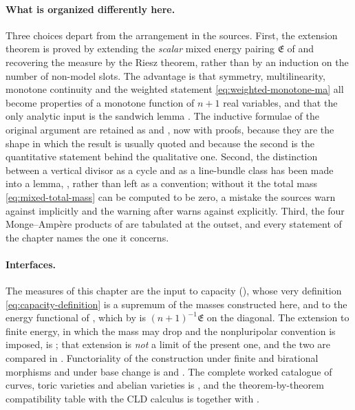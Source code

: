 \paragraph{What is organized differently here.}
Three choices depart from the arrangement in the sources.  First, the
extension theorem is proved by extending the \emph{scalar} mixed energy
pairing \(\mathfrak E\) of  and recovering the
measure by the Riesz theorem, rather than by an induction on the number of
non-model slots.  The advantage is that symmetry, multilinearity, monotone
continuity and the weighted statement \eqref{eq:weighted-monotone-ma} all
become properties of a monotone function of \(n+1\) real variables, and that
the only analytic input is the sandwich lemma
.  The inductive formulae of the original argument
are retained as  and
, now with proofs, because they are
the shape in which the result is usually quoted and because the second is the
quantitative statement behind the qualitative one.  Second, the distinction
between a vertical divisor as a cycle and as a line-bundle class has been
made into a lemma, , rather than left as a
convention; without it the total mass \eqref{eq:mixed-total-mass} can be
computed to be zero, a mistake the sources warn against implicitly and the
warning after  warns against explicitly.
Third, the four Monge--Amp\`ere products of  are
tabulated at the outset, and every statement of the chapter names the one it
concerns.

\paragraph{Interfaces.}
The measures of this chapter are the input to capacity
(), whose very definition
\eqref{eq:capacity-definition} is a supremum of the masses constructed here,
and to the energy functional of , which by
 is \((n+1)^{-1}\mathfrak E\) on the diagonal.
The extension to finite energy, in which the mass may drop and the
nonpluripolar convention  is imposed, is
; that extension is \emph{not} a limit of the
present one, and the two are compared in
.  Functoriality of the construction under
finite and birational morphisms and under base change is
 and .  The complete
worked catalogue of curves, toric varieties and abelian varieties is
, and the theorem-by-theorem compatibility table
with the CLD calculus is  together with
.

